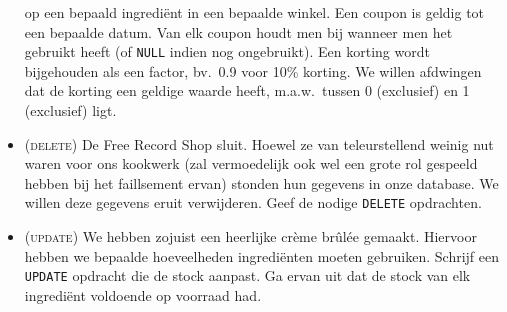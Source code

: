 \documentclass[a4paper]{article}
\begin{document}
\begin{itemize}
        op een bepaald ingredi\"ent in een bepaalde winkel. Een coupon is geldig
        tot een bepaalde datum. Van elk coupon houdt men bij wanneer men
        het gebruikt heeft (of {\tt NULL} indien nog ongebruikt).
        Een korting wordt bijgehouden als een factor, bv.\ 0.9 voor 10\% korting.
        We willen afdwingen dat de korting een geldige waarde heeft, m.a.w.\ tussen
        0 (exclusief) en 1 (exclusief) ligt.
  \item (\textsc{delete}) De Free Record Shop sluit. Hoewel ze van teleurstellend weinig nut waren
        voor ons kookwerk (zal vermoedelijk ook wel een grote rol gespeeld hebben bij het faillsement ervan)
        stonden hun gegevens in onze database. We willen deze gegevens eruit verwijderen.
        Geef de nodige {\tt DELETE} opdrachten.
  \item (\textsc{update}) We hebben zojuist een heerlijke cr\`eme br\^ul\'ee gemaakt. Hiervoor
        hebben we bepaalde hoe\-veel\-heden ingredi\"enten moeten gebruiken.
        Schrijf een {\tt UPDATE} opdracht die de stock aanpast.
        Ga ervan uit dat de stock van elk ingredi\"ent voldoende op voorraad had.
\end{itemize}
\end{document}
